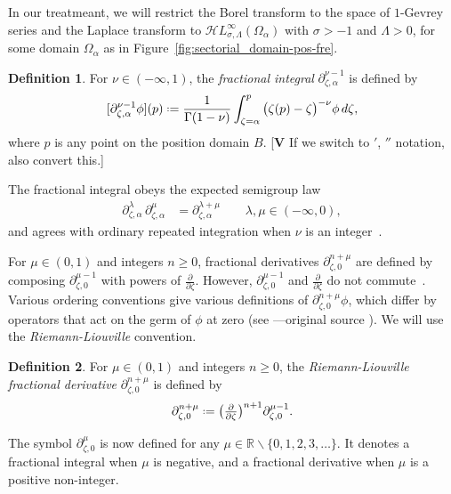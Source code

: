 \documentclass{article}
\newcommand{\singexp}[2]{\mathcal{H}L^\infty_{#1, #2}}
\newcommand{\R}{\mathbb{R}}
\newcommand{\fracderiv}[3]{\partial^{#1}_{#2, #3}}
\newcommand*{\defeq}{\mathrel{\vcenter{\baselineskip0.5ex \lineskiplimit0pt
                     \hbox{\scriptsize.}\hbox{\scriptsize.}}}%
                     =}
\theoremstyle{definition}
\newtheorem{definition}{Definition}[section]
\theoremstyle{plain}
\newenvironment{todo}{\color{Coral}}{\color{black}}
\begin{document}
In our treatmeant, we will restrict the Borel transform to the space of $1$-Gevrey series and the Laplace transform to $\singexp{\sigma}{\Lambda}(\Omega_\alpha)$ with $\sigma>-1$ and $\Lambda>0$, for some domain $\Omega_\alpha$ as in Figure~\ref{fig:sectorial_domain-pos-fre}. 
\begin{definition}
For $\nu \in (-\infty, 1)$, the \textit{fractional integral} $\partial^{\nu-1}_{\zeta, \alpha}$ is defined by
\[ [\partial^{\nu-1}_{\zeta, \alpha} \phi](p) \defeq \frac{1}{\Gamma(1-\nu)} \int_{\zeta =\alpha}^p \big(\zeta(p)-\zeta\big)^{-\nu} \phi\,d\zeta, \]
where $p$ is any point on the position domain $B$. \begin{todo}[\textbf{V} If we switch to $'$, $''$ notation, also convert this.]\end{todo}%
\end{definition}
The fractional integral obeys the expected semigroup law \cite[Section  1.3]{mladenov2014advanced}
\begin{align*}
\fracderiv{\lambda}{\zeta}{\alpha}\,\fracderiv{\mu}{\zeta}{\alpha} & = \fracderiv{\lambda+\mu}{\zeta}{\alpha} \qquad \lambda, \mu \in (-\infty, 0),
\end{align*}
and agrees with ordinary repeated integration when $\nu$ is an integer~\cite[Equation 35]{mladenov2014advanced}.

For $\mu \in (0, 1)$ and integers $n \ge 0$, fractional derivatives $\fracderiv{n+\mu}{\zeta}{0}$ are defined by composing $\fracderiv{\mu-1}{\zeta}{0}$ with powers of $\tfrac{\partial}{\partial \zeta}$. However, $\fracderiv{\mu-1}{\zeta}{0}$ and $\tfrac{\partial}{\partial \zeta}$ do not commute~\cite[equation 54]{mladenov2014advanced}. Various ordering conventions give various definitions of $\fracderiv{n+\mu}{\zeta}{0} \phi$, which differ by operators that act on the germ of $\phi$ at zero (see \cite[Section 1.3]{mladenov2014advanced}---original source \cite{podlubny}). We will use the {\em Riemann-Liouville} convention.
\begin{definition}\label{definition:frac_driv}
For $\mu \in (0, 1)$ and integers $n \ge 0$, the {\em Riemann-Liouville fractional derivative} $\fracderiv{n+\mu}{\zeta}{0}$ is defined by
\[ \fracderiv{n+\mu}{\zeta}{0} \defeq \big(\tfrac{\partial}{\partial \zeta}\big)^{n+1} \fracderiv{\mu-1}{\zeta}{0}. \]
\end{definition}
The symbol $\fracderiv{\mu}{\zeta}{0}$ is now defined for any $\mu \in \R \smallsetminus \{0, 1, 2, 3, \ldots\}$. It denotes a fractional integral when $\mu$ is negative, and a fractional derivative when $\mu$ is a positive non-integer.
\end{document}
